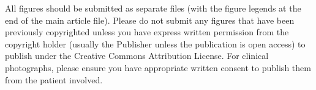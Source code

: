 All figures should be submitted as separate files (with the figure legends at the end of the main article file). Please do not submit any figures that have been previously copyrighted unless you have express written permission from the copyright holder (usually the Publisher unless the publication is open access) to publish under the Creative Commons Attribution License.
For clinical photographs, please ensure you have appropriate written consent to publish them from the patient involved.

